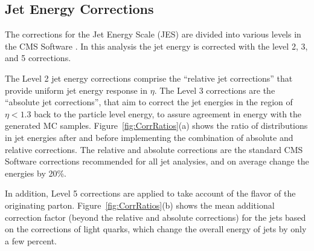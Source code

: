 
\subsection{Jet Energy Corrections}

The corrections for the Jet Energy Scale (JES) are divided into various levels in the CMS Software \cite{JES}.  
In this analysis the jet energy is corrected with the level 2, 3, and 5 corrections.

The Level 2 jet energy corrections comprise the 
``relative jet corrections'' that provide uniform jet energy response in $\eta$.  
The Level 3 corrections are the ``absolute jet corrections'', that aim to correct  the jet energies in the 
region of $\eta < 1.3$ back to the particle level energy, to assure agreement in energy with the generated MC samples. 
Figure~\ref{fig:CorrRatios}(a) shows the ratio of distributions in jet energies after and before implementing  
the combination of absolute and relative corrections.  
The relative and absolute corrections are the standard CMS Software corrections recommended for all jet analysies,
and on average change the energies by 20\%.

In addition, Level 5 corrections are applied to take account of the flavor of the originating parton.
Figure~\ref{fig:CorrRatios}(b) shows the mean additional correction factor (beyond the relative and absolute corrections) 
for the jets based on the corrections of light quarks, which change the overall energy of jets by only a few percent.

